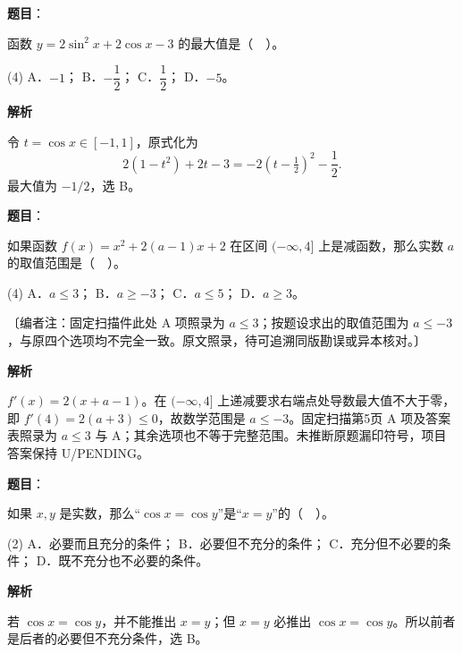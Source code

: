 \begin{answer}

\textbf{题目}：

函数 $y=2\sin^2x+2\cos x-3$ 的最大值是（　）。

\begin{gkopts}(4)
\task A．$-1$；
\task B．$-\dfrac12$；
\task C．$\dfrac12$；
\task D．$-5$。
\end{gkopts}

\textbf{解析}

令 $t=\cos x\in[-1,1]$，原式化为
\nopagebreak[4]
\[
2(1-t^2)+2t-3=-2(t-\tfrac12)^2-\frac12.
\]
最大值为 $-1/2$，选 B。


\end{answer}
\begin{answer}

\textbf{题目}：

如果函数 $f(x)=x^2+2(a-1)x+2$ 在区间 $(-\infty,4]$ 上是减函数，那么实数 $a$ 的取值范围是（　）。

\begin{gkopts}(4)
\task A．$a\le3$；
\task B．$a\ge-3$；
\task C．$a\le5$；
\task D．$a\ge3$。
\end{gkopts}
〔编者注：固定扫描件此处 A 项照录为 $a\le3$；按题设求出的取值范围为 $a\le-3$，与原四个选项均不完全一致。原文照录，待可追溯同版勘误或异本核对。〕

\textbf{解析}

$f'(x)=2(x+a-1)$。在 $(-\infty,4]$ 上递减要求右端点处导数最大值不大于零，即 $f'(4)=2(a+3)\le0$，故数学范围是 $a\le-3$。固定扫描第5页 A 项及答案表照录为 $a\le3$ 与 A；其余选项也不等于完整范围。未推断原题漏印符号，项目答案保持 U/PENDING。


\end{answer}
\begin{answer}

\textbf{题目}：

如果 $x,y$ 是实数，那么“$\cos x=\cos y$”是“$x=y$”的（　）。

\begin{gkopts}(2)
\task A．必要而且充分的条件；
\task B．必要但不充分的条件；
\task C．充分但不必要的条件；
\task D．既不充分也不必要的条件。
\end{gkopts}

\textbf{解析}

若 $\cos x=\cos y$，并不能推出 $x=y$；但 $x=y$ 必推出 $\cos x=\cos y$。所以前者是后者的必要但不充分条件，选 B。


\end{answer}
